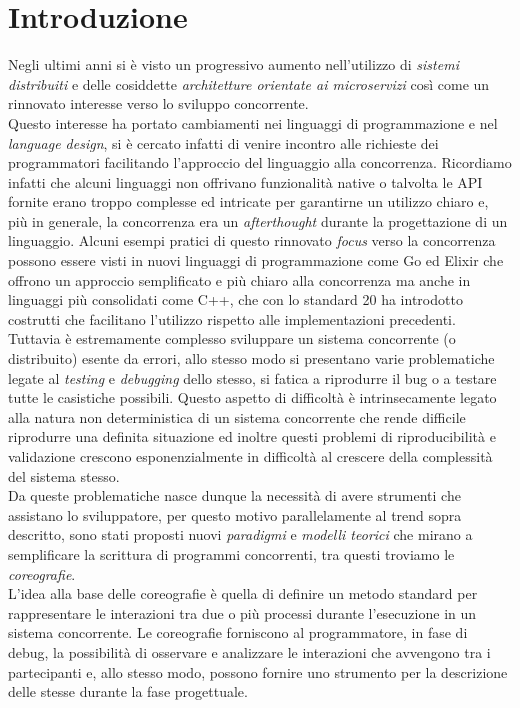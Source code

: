 \chapter{Introduzione}
Negli ultimi anni si è visto un progressivo aumento nell'utilizzo di \emph{sistemi distribuiti} e delle cosiddette \emph{architetture orientate ai microservizi} così come un rinnovato interesse verso lo sviluppo concorrente.\\
Questo interesse ha portato cambiamenti nei linguaggi di programmazione e nel \emph{language design}, si è cercato infatti di venire incontro alle richieste dei programmatori facilitando l'approccio del linguaggio alla concorrenza. Ricordiamo infatti che alcuni linguaggi non offrivano funzionalità native o talvolta le API fornite erano troppo complesse ed intricate per garantirne un utilizzo chiaro e, più in generale, la concorrenza era un \emph{afterthought} durante la progettazione di un linguaggio. Alcuni esempi pratici di questo rinnovato \emph{focus} verso la concorrenza possono essere visti in nuovi linguaggi di programmazione come Go\cite{Golang} ed Elixir\cite{Elixir} che offrono un approccio semplificato e più chiaro alla concorrenza ma anche in linguaggi più consolidati come C++\cite{C_Plus_Plus}, che con lo standard 20 ha introdotto costrutti che facilitano l'utilizzo rispetto alle implementazioni precedenti.\bigskip \\
Tuttavia è estremamente complesso sviluppare un sistema concorrente (o distribuito) esente da errori, allo stesso modo si presentano varie problematiche legate al \emph{testing} e \emph{debugging} dello stesso, si fatica a riprodurre il bug o a testare tutte le casistiche possibili. Questo aspetto di difficoltà è intrinsecamente legato alla natura non deterministica di un sistema concorrente che rende difficile riprodurre una definita situazione ed inoltre questi problemi di riproducibilità e validazione crescono esponenzialmente in difficoltà al crescere della complessità del sistema stesso.\bigskip \\
Da queste problematiche nasce dunque la necessità di avere strumenti che assistano lo sviluppatore, per questo motivo parallelamente al trend sopra descritto, sono stati proposti nuovi \emph{paradigmi} e \emph{modelli teorici} che mirano a semplificare la scrittura di programmi concorrenti, tra questi troviamo le \emph{coreografie}\cite{Choreographies}.\\
L'idea alla base delle coreografie è quella di definire un metodo standard per rappresentare le interazioni tra due o più processi durante l'esecuzione in un sistema concorrente. Le coreografie forniscono al programmatore, in fase di debug, la possibilità di osservare e analizzare le interazioni che avvengono tra i partecipanti e, allo stesso modo, possono fornire uno strumento per la descrizione delle stesse durante la fase progettuale.\bigskip \\

